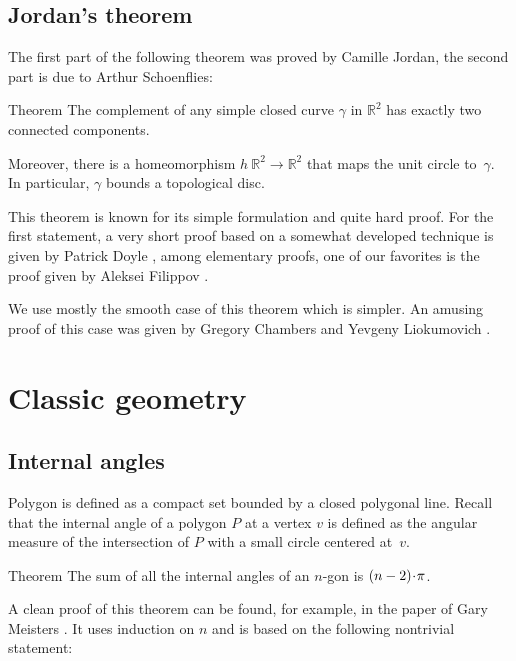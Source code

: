 \begin{multicols}{2}
{\subsection*{Jordan's theorem}

The first part of the following theorem was proved by Camille Jordan, the second part is due to Arthur Schoenflies:

\begin{thm}{Theorem}\label{thm:jordan}
The complement of any simple closed curve $\gamma$ in $\mathbb{R}^2$ has exactly two connected components. 

Moreover, there is a homeomorphism $h\:\mathbb{R}^2\to \mathbb{R}^2$ that maps the unit circle to~$\gamma$.
In particular, $\gamma$ bounds a topological disc.
\end{thm}

This theorem is known for its simple formulation and quite hard proof.
For the first statement, a very short proof based on a somewhat developed technique is given by Patrick Doyle \cite{doyle},
among elementary proofs, one of our favorites is the proof given by Aleksei Filippov \cite{filippov}.

We use mostly the smooth case of this theorem which is simpler.
An amusing proof of this case was given by Gregory Chambers and Yevgeny Liokumovich \cite{chambers-liokumovich}.

\section{Classic geometry}


\subsection*{Internal angles}

Polygon is defined as a compact set bounded by a closed polygonal line. 
Recall that the internal angle of a polygon $P$ at a vertex $v$
is defined as the angular measure of the intersection of $P$ with a small circle centered at~$v$.

\begin{thm}{Theorem}\label{thm:sum=(n-2)pi}
The sum of all the internal angles of an $n$-gon is $(n\z-2)\cdot\pi$. 
\end{thm}

A clean proof of this theorem can be found, for example, in the paper of Gary Meisters \cite{meisters}.
It uses induction on $n$ and is based on the following nontrivial statement:

}
\end{multicols}
